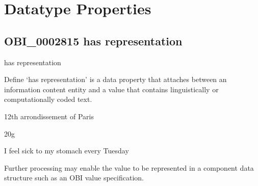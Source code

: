 \documentclass[letterpaper,10pt,english]{sphinxmanual}
\begin{document}
\chapter{Datatype Properties}
\label{\detokenize{datatype-properties:datatype-properties}}\label{\detokenize{datatype-properties::doc}}\begin{quote}
\label{\detokenize{doc-OBI_0002815:obi-0002815}}\label{\detokenize{doc-OBI_0002815:has-representation}}\label{\detokenize{doc-OBI_0002815:obi-0002815}}
\ignorespaces \end{quote}


\section{OBI\_0002815 \sphinxhyphen{} has representation}
\label{\detokenize{doc-OBI_0002815:obi-0002815-has-representation}}\label{\detokenize{doc-OBI_0002815:index-0}}\label{\detokenize{doc-OBI_0002815::doc}}
\begin{sphinxShadowBox}

\sphinxAtStartPar
has representation
\end{sphinxShadowBox}

\begin{sphinxShadowBox}

\sphinxAtStartPar
Define ‘has representation’ is a data property that attaches between an information content entity and a value that contains linguistically or computationally coded text.
\end{sphinxShadowBox}

\begin{sphinxShadowBox}

\sphinxAtStartPar
12th arrondissement of Paris

\sphinxAtStartPar
20g

\sphinxAtStartPar
I feel sick to my stomach every Tuesday
\end{sphinxShadowBox}

\begin{sphinxShadowBox}

\sphinxAtStartPar
Further processing may enable the value to be represented in a component data structure such as an OBI value specification.
\end{sphinxShadowBox}
\end{document}
